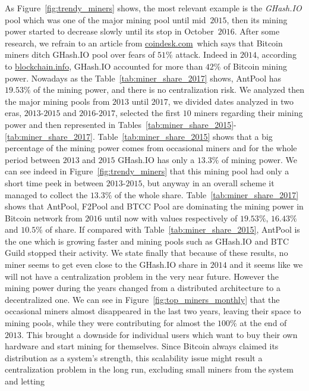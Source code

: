 \documentclass[USenglish]{uit-thesis}
\begin{document}
As Figure~\ref{fig:trendy_miners} shows, the most relevant example is the \emph{GHash.IO}
pool which was one of the major mining
pool until mid~$2015$, then its mining power started to decrease
slowly until its stop in October~$2016$. After some research,
we refrain to an article from \url{coindesk.com}\,\cite{coindesk_ghash_ditched}
which says that Bitcoin miners ditch GHash.IO pool over
fears of $51\%$ attack. Indeed in $2014$, according to \url{blockchain.info},
GHash.IO accounted for more than $42\%$ of Bitcoin mining power.
Nowadays as the Table~\ref{tab:miner_share_2017} shows, AntPool has $19.53\%$ of
the mining power, and there is no centralization risk.
We analyzed then the major mining pools from $2013$ until $2017$, we divided
dates analyzed in two eras, $2013$-$2015$ and $2016$-$2017$,
selected the first $10$ miners regarding their mining power and then 
represented in Tables~\ref{tab:miner_share_2015}-\ref{tab:miner_share_2017}.
Table~\ref{tab:miner_share_2015} shows that a big percentage of the mining
power comes from occasional miners and for the whole period
between $2013$ and $2015$ GHash.IO has only a $13.3\%$ of
mining power. We can see indeed in Figure~\ref{fig:trendy_miners}
that this mining pool had only a short time peek in between $2013$-$2015$,
but anyway in an overall scheme it managed to collect the $13.3\%$
of the whole share. Table~\ref{tab:miner_share_2017} shows that
AntPool, F2Pool and BTCC Pool are dominating the mining
power in Bitcoin network from $2016$ until now with values
respectively of $19.53\%$, $16.43\%$ and $10.5\%$ of share.
If compared with Table~\ref{tab:miner_share_2015}, AntPool
is the one which is growing faster and mining
pools such as GHash.IO and BTC Guild stopped their activity.
We state finally that because of these results, no miner seems to get
even close to the GHash.IO share in $2014$ and it
seems like we will not have
a centralization problem in the very near future.
However the mining power during the years
changed from a distributed architecture to a decentralized one.
We can see in Figure~\ref{fig:top_miners_monthly} that the
occasional miners almost disappeared in the last two years,
leaving their space to mining pools, while they were contributing
for almost the $100\%$ at the end of $2013$. This brought a
downside for individual users which want to buy
their own hardware and start mining for themselves.
Since Bitcoin always claimed its distribution as a 
system's strength, this scalability issue
might result a centralization problem in the long run,
excluding small miners from the system and letting
\end{document}
